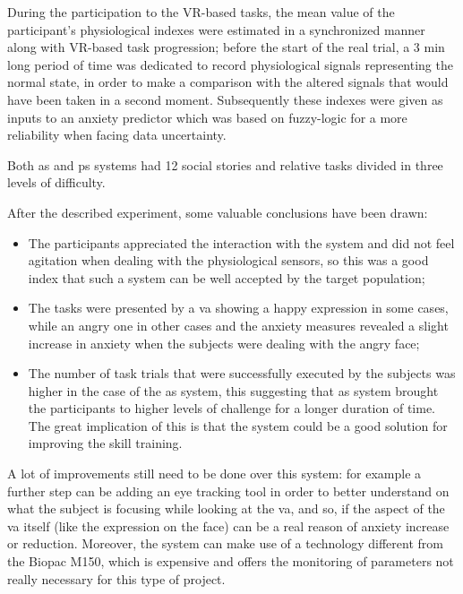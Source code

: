 \documentclass[12pt,journal,draftclsnofoot,onecolumn]{IEEEtran}
\makeatletter
\let\origsubsubsection\subsubsection
\renewcommand\subsubsection{\@ifstar{\starsubsubsection}{\nostarsubsubsection}}
\newcommand\nostarsubsubsection[1]
{\subsubsectionprelude\origsubsubsection{#1}}
\newcommand\subsubsectionprelude{%
  \vspace{6pt}
}
\makeatother
\begin{document}
During the participation to the VR-based tasks, the mean value of the participant's physiological indexes were estimated in a synchronized manner along with VR-based task progression; before the start of the real trial, a 3 min long period of time was dedicated to record physiological signals representing the normal state, in order to make a comparison with the altered signals that would have been taken in a second moment. Subsequently these indexes were given as inputs to an anxiety predictor which was based on fuzzy-logic for a more reliability when facing data uncertainty.

Both \gls{as} and \gls{ps} systems had 12 social stories and relative tasks divided in three levels of difficulty.

\subsubsection{Results}
\label{sec:resultsVR}
After the described experiment, some valuable conclusions have been drawn:
\begin{itemize}
\item The participants appreciated the interaction with the system and did not feel agitation when dealing with the physiological sensors, so this was a good index that such a system can be well accepted by the target population;
\item The tasks were presented by a \gls{va} showing a happy expression in some cases, while an angry one in other cases and the anxiety measures revealed a slight increase in anxiety when the subjects were dealing with the angry face;
\item The number of task trials that were successfully executed by the subjects was higher in the case of the \gls{as} system, this suggesting that \gls{as} system brought the participants to higher levels of challenge for a longer duration of time. The great implication of this is that the system could be a good solution for improving the skill training.
\end{itemize}

A lot of improvements still need to be done over this system: for example a further step can be adding an eye tracking tool in order to better understand on what the subject is focusing while looking at the \gls{va}, and so, if the aspect of the \gls{va} itself (like the expression on the face) can be a real reason of anxiety increase or reduction. Moreover, the system can make use of a technology different from the Biopac M150, which is expensive and offers the monitoring of parameters not really necessary for this type of project.
\end{document}
